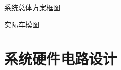 \documentclass{article}%
\begin{document}
\begin{multicols}{2}
		\begin{center}
			\caption{系统总体方案框图}
		\end{center}
		
		\begin{center}
			\caption{实际车模图}		
		\end{center}
		
		
		\section{系统硬件电路设计}
		

\end{multicols}
\end{document}
